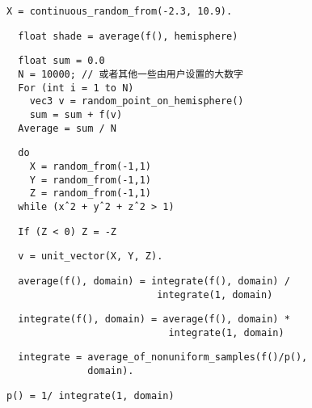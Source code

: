 \documentclass[lang=cn,12pt]{elegantbook}
\begin{document}
\verb"X = continuous_random_from(-2.3, 10.9)."

\begin{lstlisting}
  float shade = average(f(), hemisphere)
\end{lstlisting}

\begin{lstlisting}
  float sum = 0.0
  N = 10000; // 或者其他一些由用户设置的大数字
  For (int i = 1 to N)
    vec3 v = random_point_on_hemisphere()
    sum = sum + f(v)
  Average = sum / N
\end{lstlisting}

\begin{lstlisting}
  do
    X = random_from(-1,1)
    Y = random_from(-1,1)
    Z = random_from(-1,1)
  while (xˆ2 + yˆ2 + zˆ2 > 1)
\end{lstlisting}

\begin{lstlisting}
  If (Z < 0) Z = -Z
\end{lstlisting}

\begin{lstlisting}
  v = unit_vector(X, Y, Z).
\end{lstlisting}

\begin{lstlisting}
  average(f(), domain) = integrate(f(), domain) /
                          integrate(1, domain)
\end{lstlisting}

\begin{lstlisting}
  integrate(f(), domain) = average(f(), domain) *
                            integrate(1, domain)
\end{lstlisting}

\begin{lstlisting}
  integrate = average_of_nonuniform_samples(f()/p(),
              domain).
\end{lstlisting}

\verb"p() = 1/ integrate(1, domain)"

\begin{lstlisting}
  
\end{lstlisting}
\end{document}
